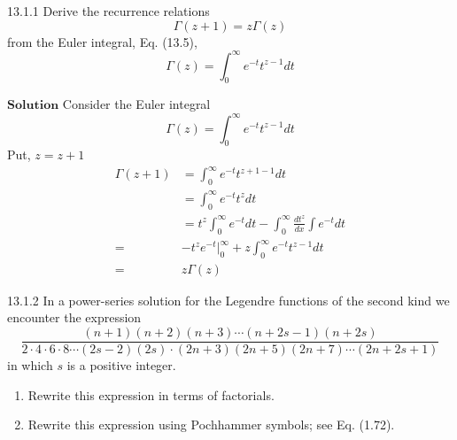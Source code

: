 


\begin{mybox}{13.1.1}
Derive the recurrence relations
$$
\Gamma(z+1)=z \Gamma(z)
$$
from the Euler integral, Eq. (13.5),
$$
\Gamma(z)=\int_{0}^{\infty} e^{-t} t^{z-1} d t
$$
\end{mybox}

$\boxed{\textbf{Solution}}$ Consider the Euler integral 
$$\Gamma (z)=\int_{0}^{\infty} e^{-t} t^{z-1} d t$$
Put, $z=z+1$
$$
\begin{aligned}
\Gamma(z+1) &=\int_{0}^{\infty} e^{-t} t^{z+1-1} d t \\
&=\int_{0}^{\infty} e^{-t} t^{z} d t \\
&=t^{z} \int_{0}^{\infty} e^{-t} d t-\int_{0}^{\infty} \frac{d t^{z}}{d x} \int e^{-t} d t \\
=&-t^{z} e^{-t}\Big|_{0} ^{\infty}+z \int_{0}^{\infty} e^{-t} t^{z-1} d t \\
=& z \Gamma(z)
\end{aligned}
$$

\newpage

\begin{mybox}{13.1.2}
In a power-series solution for the Legendre functions of the second kind we encounter the expression
$$
\frac{(n+1)(n+2)(n+3) \cdots(n+2 s-1)(n+2 s)}{2 \cdot 4 \cdot 6 \cdot 8 \cdots(2 s-2)(2 s) \cdot(2 n+3)(2 n+5)(2 n+7) \cdots(2 n+2 s+1)}
$$
in which $s$ is a positive integer.
\begin{enumerate}[$(a)$]
\item Rewrite this expression in terms of factorials.
\item Rewrite this expression using Pochhammer symbols; see Eq. (1.72).
\end{enumerate}
\end{mybox}

